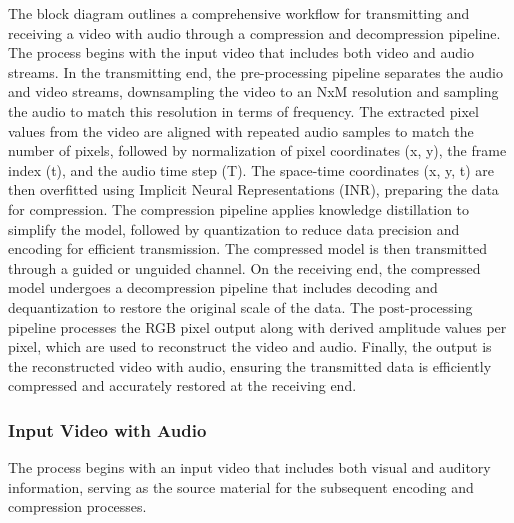         The block diagram outlines a comprehensive workflow for transmitting and receiving a video with audio through a compression and decompression pipeline. The process begins with the input video that includes both video and audio streams. In the transmitting end, the pre-processing pipeline separates the audio and video streams, downsampling the video to an NxM resolution and sampling the audio to match this resolution in terms of frequency. The extracted pixel values from the video are aligned with repeated audio samples to match the number of pixels, followed by normalization of pixel coordinates (x, y), the frame index (t), and the audio time step (T). The space-time coordinates (x, y, t) are then overfitted using Implicit Neural Representations (INR), preparing the data for compression. The compression pipeline applies knowledge distillation to simplify the model, followed by quantization to reduce data precision and encoding for efficient transmission. The compressed model is then transmitted through a guided or unguided channel. On the receiving end, the compressed model undergoes a decompression pipeline that includes decoding and dequantization to restore the original scale of the data. The post-processing pipeline processes the RGB pixel output along with derived amplitude values per pixel, which are used to reconstruct the video and audio. Finally, the output is the reconstructed video with audio, ensuring the transmitted data is efficiently compressed and accurately restored at the receiving end.

        \subsubsection{Input Video with Audio}
        The process begins with an input video that includes both visual and auditory information, serving as the source material for the subsequent encoding and compression processes.

